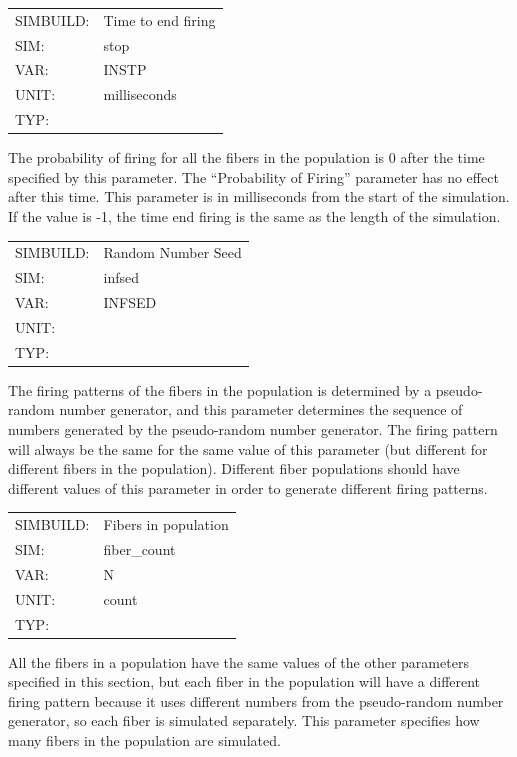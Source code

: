\documentclass[12pt,openany,oneside]{book}
\newcommand{\inquotes}[1]{{{``#1''}}}
\begin{document}
\begin{flushleft}
\begin{tabular}{@{}ll@{}}
SIMBUILD: & Time to end firing\\
SIM: & stop\\
VAR: & INSTP\\
UNIT: & milliseconds\\
TYP: &\\
\end{tabular}
\end{flushleft}
The probability of firing for all the fibers in the population is 0
after the time specified by this parameter. The \inquotes{Probability of
Firing} parameter has no effect after this time. This parameter is
in milliseconds from the start of the simulation. If the value is -1, the
time end firing is the same as the length of the simulation.
\noindent
\filbreak
\vspace{\baselineskip}

\begin{flushleft}
\begin{tabular}{@{}ll@{}}
SIMBUILD: & Random Number Seed\\
SIM: & infsed\\
VAR: & INFSED\\
UNIT: &\\
TYP: &\\
\end{tabular}
\end{flushleft}
\noindent
The firing patterns of the fibers in the population is determined by a
pseudo-random number generator, and this parameter determines the
sequence of numbers generated by the pseudo-random number generator.
The firing pattern will always be the same for the same value of this
parameter (but different for different fibers in the population).
Different fiber populations should have different values of this
parameter in order to generate different firing patterns.
\filbreak
\vspace{\baselineskip}

\begin{flushleft}
\begin{tabular}{@{}ll@{}}
SIMBUILD: & Fibers in population\\
SIM: & fiber\_count\\
VAR: & N\\
UNIT: & count\\
TYP: &\\
\end{tabular}
\end{flushleft}
\noindent
All the fibers in a population have the same values of the other
parameters specified in this section, but each fiber in the population
will have a different firing pattern because it uses different numbers
from the pseudo-random number generator, so each fiber is simulated
separately. This parameter specifies how many fibers in the population
are simulated.
\filbreak
\vspace{\baselineskip}
\end{document}
